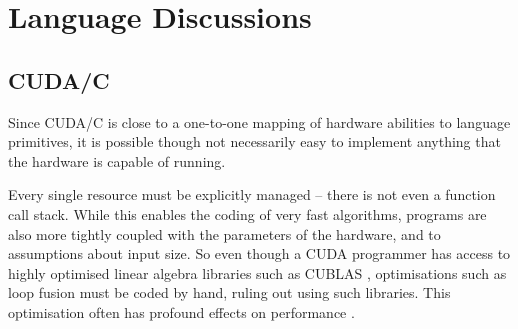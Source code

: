 


\chapter{Language Discussions}


\section{CUDA/C}

Since CUDA/C is close to a one-to-one mapping of hardware abilities to language
primitives, it is possible though not necessarily easy to implement anything
that the hardware is capable of running.

Every single resource must be explicitly managed -- there is not even a
function call stack. While this enables the coding of very fast algorithms,
programs are also more tightly coupled with the parameters of the hardware, and
to assumptions about input size. So even though a CUDA programmer has access to
highly optimised linear algebra libraries such as CUBLAS \cite{CUBLAS2013},
optimisations such as loop fusion must be coded by hand, ruling out using such
libraries. This optimisation often has profound effects on performance
\cite{mainlandhaskell}.


